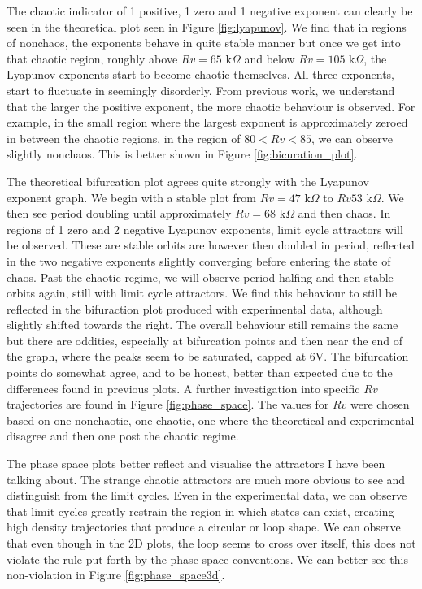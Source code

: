\documentclass[aps,prl,reprint,10pt,amsmath,amssymb,superscriptaddress,a4paper]{revtex4-2}
\begin{document}
The chaotic indicator of 1 positive, 1 zero and 1 negative exponent can clearly be seen in the theoretical plot seen in Figure \ref{fig:lyapunov}. We find that in regions of nonchaos, the exponents behave in quite stable manner but once we get into that chaotic 
region, roughly above $Rv= 65$ k$\Omega$ and below $Rv=105$ k$\Omega$, the Lyapunov exponents start to become chaotic themselves. All three exponents, start to fluctuate in seemingly disorderly. From previous work, we understand that the larger the positive exponent, the 
more chaotic behaviour is observed. For example, in the small region where the largest exponent is approximately zeroed in between the chaotic regions, in the region of $80 < Rv < 85$, we can observe slightly nonchaos. This is better shown in Figure \ref{fig:bicuration_plot}.

The theoretical bifurcation plot agrees quite strongly with the Lyapunov exponent graph. We begin with a stable plot from $Rv=47$ k$\Omega$ to $Rv 53$ k$\Omega$. We then see period doubling until approximately $Rv=68$ k$\Omega$ and then chaos. In regions of 1 zero and 2 negative 
Lyapunov exponents, limit cycle attractors will be observed. These are stable orbits are however then doubled in period, reflected in the two negative exponents slightly converging before entering the state of chaos. Past the chaotic regime, we will observe period halfing and then 
stable orbits again, still with limit cycle attractors. We find this behaviour to still be reflected in the bifuraction plot produced with experimental data, although slightly shifted towards the right. The overall behaviour still remains the same but there are oddities, especially at 
bifurcation points and then near the end of the graph, where the peaks seem to be saturated, capped at 6V. The bifurcation points do somewhat agree, and to be honest, better than expected due to the differences found in previous plots. A further investigation into specific $Rv$ trajectories 
are found in Figure \ref{fig:phase_space}. The values for $Rv$ were chosen based on one nonchaotic, one chaotic, one where the theoretical and experimental disagree and then one post the chaotic regime.

The phase space plots better reflect and visualise the attractors I have been talking about. The strange chaotic attractors are much more obvious to see and distinguish from the limit cycles. Even in the experimental data, we can observe that limit cycles 
greatly restrain the region in which states can exist, creating high density trajectories that produce a circular or loop shape. We can observe that even though in the 2D plots, the loop seems to cross over itself, this does not violate the rule put forth 
by the phase space conventions. We can better see this non-violation in Figure \ref{fig:phase_space3d}.
\end{document}

